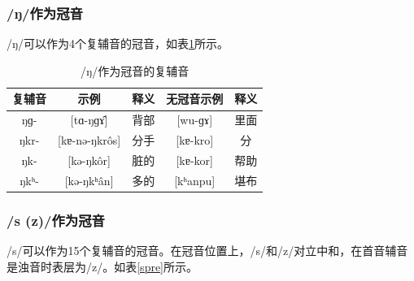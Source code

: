 \subsubsection{/ŋ/作为冠音}

/ŋ/可以作为4个复辅音的冠音，如表\ref{ngpre}所示。

\begin{table}[H]
\vspace{5pt}
    \centering
    \caption{/ŋ/作为冠音的复辅音}
    \label{ngpre}
\begin{tabular}{c|cccc}
     \toprule
复辅音   & 示例              & 释义   & 无冠音示例          & 释义        \\
     \midrule
	ŋɡ-  & {[}tɑ-ŋɡɤ̂{]}      & 背部 & {[}wu-ɡɤ{]}  & 里面 \\
ŋkr- & {[}kɐ-nə-ŋkrôs{]} & 分手 & {[}kɐ-kro{]} & 分  \\
ŋk-  & {[}kə-ŋkôr{]}     & 脏的 & {[}kɐ-kor{]} & 帮助 \\
ŋkʰ- & {[}kə-ŋkʰân{]}    & 多的 & {[}kʰanpu{]} & 堪布\\ 
   \bottomrule
\end{tabular}
\end{table}

\subsubsection{/s (z)/作为冠音}

/s/可以作为15个复辅音的冠音。在冠音位置上，/s/和/z/对立中和，在首音辅音是浊音时表层为/z/。如表\ref{spre}所示。

